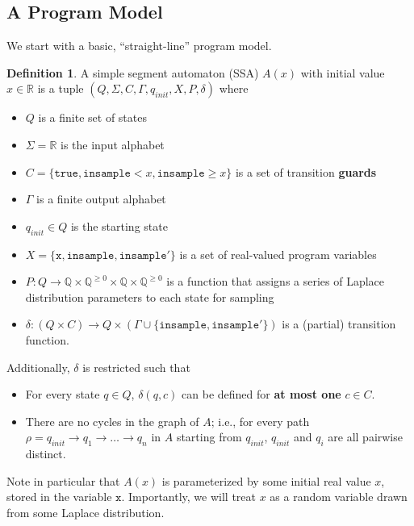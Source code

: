 \documentclass[12pt]{article}
\newcommand{\QQ}{\mathbb{Q}}
\newcommand{\RR}{\mathbb{R}}
\newcommand{\gguard}[1][x]{\texttt{insample}\geq #1}
\newcommand{\lguard}[1][x]{\texttt{insample} < #1}
\theoremstyle{definition}
\newtheorem{defn}[thm]{Definition}
\begin{document}
\subsection{A Program Model}


We start with a basic, ``straight-line'' program model. 

\begin{defn}\label{SSADefn}
    A simple segment automaton (SSA) $A(x)$ with initial value $x\in \RR$ is a tuple $(Q, \Sigma, C, \Gamma, q_{init}, X, P, \delta)$ where\begin{itemize}
        \item $Q$ is a finite set of states
        \item $\Sigma = \RR$ is the input alphabet
        \item $C = \{\texttt{true}, \lguard, \gguard\}$ is a set of transition \textbf{guards}
        \item $\Gamma$ is a finite output alphabet
        \item $q_{init}\in Q$ is the starting state
        \item $X = \{\texttt{x}, \texttt{insample}, \texttt{insample}'\}$ is a set of real-valued program variables
        \item $P: Q\to \QQ\times \QQ^{\geq 0}\times \QQ\times  \QQ^{\geq 0}$ is a function that assigns a series of Laplace distribution parameters to each state for sampling
        \item $\delta: (Q\times C)\to Q\times (\Gamma\cup\{\texttt{insample}, \texttt{insample}'\})$ is a (partial) transition function. 
    \end{itemize}
    Additionally, $\delta$ is restricted such that \begin{itemize}  
        \item For every state $q\in Q$,  $\delta(q, c)$ can be defined for \textbf{at most one} $c\in C$. 
        \item There are no cycles in the graph of $A$; i.e., for every path $\rho = q_{init} \to q_1\to\ldots\to q_n$ in $A$ starting from $q_{init}$, $q_{init}$ and $q_i$ are all pairwise distinct. 
    \end{itemize}

    Note in particular that $A(x)$ is parameterized by some initial real value $x$, stored in the variable $\texttt{x}$. Importantly, we will treat $x$ as a random variable drawn from some Laplace distribution.
\end{defn}
\end{document}

